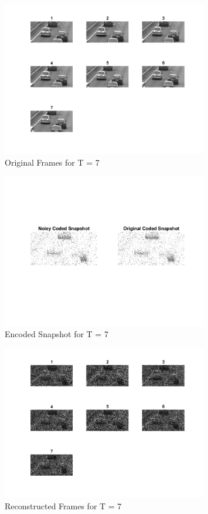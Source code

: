 \documentclass[a4paper,12pt]{article}
\begin{document}
\begin{figure}[htbp]
  \centering
  \includegraphics[width=0.8\textwidth]{../images/original_frames_7.png}
  \caption{Original Frames for T = 7}
\end{figure}

\begin{figure}[htbp]
  \centering
  \includegraphics[width=0.8\textwidth]{../images/noisy_coded_snapshot_7.png}
  \caption{Encoded Snapshot for T = 7}
\end{figure}

\begin{figure}[htbp]
  \centering
  \includegraphics[width=0.8\textwidth]{../images/reconstructed_frames_7.png}
  \caption{Reconstructed Frames for T = 7}
\end{figure}
\end{document}
